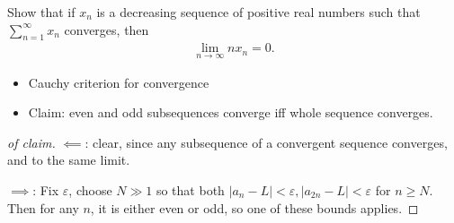 Show that if \(x_n\) is a decreasing sequence of positive real numbers
such that \(\sum_{n=1}^\infty x_n\) converges, then
\begin{align*}
\lim_{n\to\infty} n x_n = 0.
\end{align*}

\begin{concept}

\envlist

\begin{itemize}
\tightlist
\item
  Cauchy criterion for convergence
\item
  Claim: even and odd subsequences converge iff whole sequence
  converges.
\end{itemize}

\end{concept}

\begin{proof}[of claim]

\(\impliedby\): clear, since any subsequence of a convergent sequence
converges, and to the same limit.

\(\implies\): Fix \({\varepsilon}\), choose \(N\gg 1\) so that both
\({\left\lvert {a_n - L} \right\rvert} < {\varepsilon}, {\left\lvert {a_{2n} - L} \right\rvert} < {\varepsilon}\)
for \(n\geq N\). Then for any \(n\), it is either even or odd, so one of
these bounds applies.

\end{proof}


